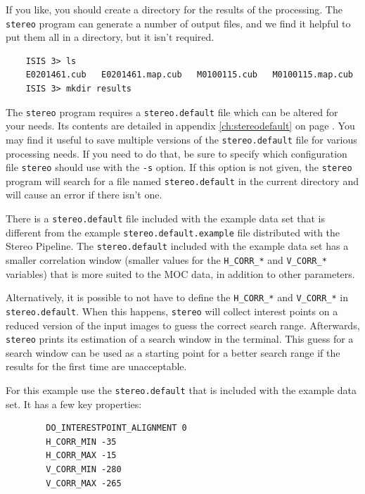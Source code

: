 If you like, you should create a directory for the results of the
processing.  The \texttt{stereo} program can generate a number of
output files, and we find it helpful to put them all in a directory,
but it isn't required.

\begin{verbatim}
    ISIS 3> ls
    E0201461.cub   E0201461.map.cub   M0100115.cub   M0100115.map.cub
    ISIS 3> mkdir results
\end{verbatim}
\noindent

The \texttt{stereo} program requires a \texttt{stereo.default} file
which can be altered for your needs.  Its contents are detailed in
appendix \ref{ch:stereodefault} on page \pageref{ch:stereodefault}.
You may find it useful to save multiple versions of the
\texttt{stereo.default} file for various processing needs. If you
need to do that, be sure to specify which configuration file
\texttt{stereo} should use with the \texttt{-s} option.  If this
option is not given, the \texttt{stereo} program will search for a
file named \texttt{stereo.default} in the current directory and
will cause an error if there isn't one.

There is a \texttt{stereo.default} file included with the example
data set that is different from the example \texttt{stereo.default.example}
file distributed with the Stereo Pipeline.  The \texttt{stereo.default}
included with the example data set has a smaller correlation window
(smaller values for the \texttt{H\_CORR\_*} and \texttt{V\_CORR\_*}
variables) that is more suited to the MOC data, in addition to other
parameters.

Alternatively, it is possible to not have to define the
\texttt{H\_CORR\_*} and \texttt{V\_CORR\_*} in
\texttt{stereo.default}. When this happens, \texttt{stereo} will
collect interest points on a reduced version of the input images to
guess the correct search range. Afterwards, \texttt{stereo} prints its
estimation of a search window in the terminal. This guess for a search
window can be used as a starting point for a better search range if
the results for the first time are unacceptable.

For this example use the \texttt{stereo.default} that is included with
the example data set. It has a few key properties:

\begin{verbatim}
        DO_INTERESTPOINT_ALIGNMENT 0
        H_CORR_MIN -35
        H_CORR_MAX -15
        V_CORR_MIN -280
        V_CORR_MAX -265
\end{verbatim}
\noindent

